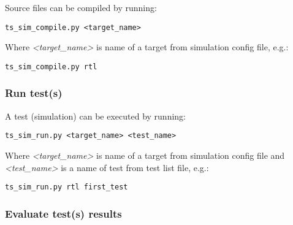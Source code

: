 \documentclass{tropic_design_spec}
\begin{document}
Source files can be compiled by running:

\begin{lstlisting}
ts_sim_compile.py <target_name>
\end{lstlisting}

Where \textit{<target_name>} is name of a target from simulation config file, e.g.:

\begin{lstlisting}
ts_sim_compile.py rtl
\end{lstlisting}




\subsubsection{Run test(s)}
\label{sec:run-tests}

A test (simulation) can be executed by running:

\begin{lstlisting}
ts_sim_run.py <target_name> <test_name>
\end{lstlisting}

Where \textit{<target_name>} is name of a target from simulation config file and
\textit{<test_name>} is a name of test from test list file, e.g.:

\begin{lstlisting}
ts_sim_run.py rtl first_test
\end{lstlisting}



\subsubsection{Evaluate test(s) results}
\label{sec:evaluate-test-results}
\end{document}
